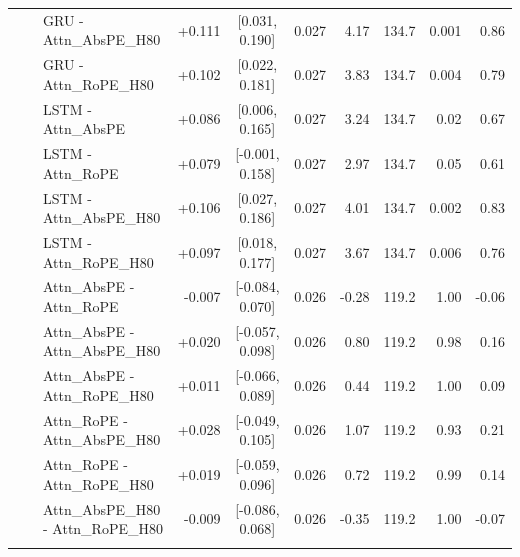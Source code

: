 \begin{longtable}{@{}lllrcrrrrr@{}}
 &  & GRU - Attn\_AbsPE\_H80 & +0.111 & [0.031, 0.190] & 0.027 & 4.17 & 134.7 & 0.001 & 0.86 \\
 &  & GRU - Attn\_RoPE\_H80 & +0.102 & [0.022, 0.181] & 0.027 & 3.83 & 134.7 & 0.004 & 0.79 \\
 &  & LSTM - Attn\_AbsPE & +0.086 & [0.006, 0.165] & 0.027 & 3.24 & 134.7 & 0.02 & 0.67 \\
 &  & LSTM - Attn\_RoPE & +0.079 & [-0.001, 0.158] & 0.027 & 2.97 & 134.7 & 0.05 & 0.61 \\
 &  & LSTM - Attn\_AbsPE\_H80 & +0.106 & [0.027, 0.186] & 0.027 & 4.01 & 134.7 & 0.002 & 0.83 \\
 &  & LSTM - Attn\_RoPE\_H80 & +0.097 & [0.018, 0.177] & 0.027 & 3.67 & 134.7 & 0.006 & 0.76 \\
 &  & Attn\_AbsPE - Attn\_RoPE & -0.007 & [-0.084, 0.070] & 0.026 & -0.28 & 119.2 & 1.00 & -0.06 \\
 &  & Attn\_AbsPE - Attn\_AbsPE\_H80 & +0.020 & [-0.057, 0.098] & 0.026 & 0.80 & 119.2 & 0.98 & 0.16 \\
 &  & Attn\_AbsPE - Attn\_RoPE\_H80 & +0.011 & [-0.066, 0.089] & 0.026 & 0.44 & 119.2 & 1.00 & 0.09 \\
 &  & Attn\_RoPE - Attn\_AbsPE\_H80 & +0.028 & [-0.049, 0.105] & 0.026 & 1.07 & 119.2 & 0.93 & 0.21 \\
 &  & Attn\_RoPE - Attn\_RoPE\_H80 & +0.019 & [-0.059, 0.096] & 0.026 & 0.72 & 119.2 & 0.99 & 0.14 \\
 &  & Attn\_AbsPE\_H80 - Attn\_RoPE\_H80 & -0.009 & [-0.086, 0.068] & 0.026 & -0.35 & 119.2 & 1.00 & -0.07 \\
\addlinespace[2pt]
\end{longtable}
\normalsize
